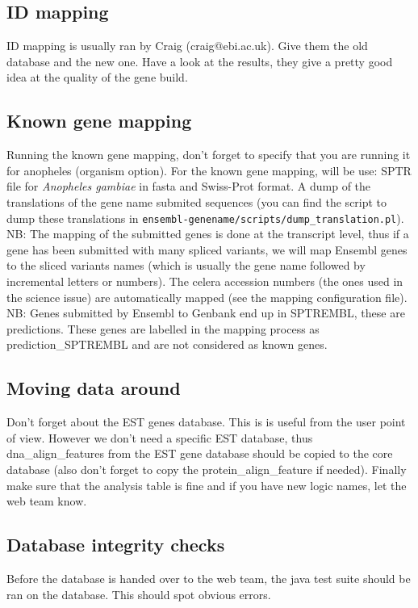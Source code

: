 \documentclass[a4paper,10pt]{article}
\begin{document}
\subsection{ID mapping}
ID mapping is usually ran by Craig (craig@ebi.ac.uk). Give them the old database and the new one. Have a look at the results, they give a pretty good idea at the quality of the gene build.

\subsection{Known gene mapping}
Running the known gene mapping, don't forget to specify that you are running it for anopheles (organism option). For the known gene mapping, will be use: SPTR file for \textit{Anopheles gambiae} in fasta and Swiss-Prot format. A dump of the translations of the gene name submited sequences (you can find the script to dump these translations in \texttt{ensembl-genename/scripts/dump\_translation.pl}). NB: The mapping of the submitted genes is done at the transcript level, thus if a gene has been submitted with many spliced variants, we will map Ensembl genes to the sliced variants names (which is usually the gene name followed by incremental letters or numbers).
The celera accession numbers (the ones used in the science issue) are automatically mapped (see the mapping configuration file). 
NB: Genes submitted by Ensembl to Genbank end up in SPTREMBL, these are predictions. These genes are labelled in the mapping process as prediction\_SPTREMBL and are not considered as known genes.

\subsection{Moving data around}
Don't forget about the EST genes database. This is is useful from the user point of view. However we don't need a specific EST database, thus dna\_align\_features from the EST gene database should be copied to the core database (also don't forget to copy the protein\_align\_feature if needed). Finally make sure that the analysis table is fine and if you have new logic names, let the web team know.

\subsection{Database integrity checks}
Before the database is handed over to the web team, the java test suite should be ran on the database. This should spot obvious errors.
\end{document}
